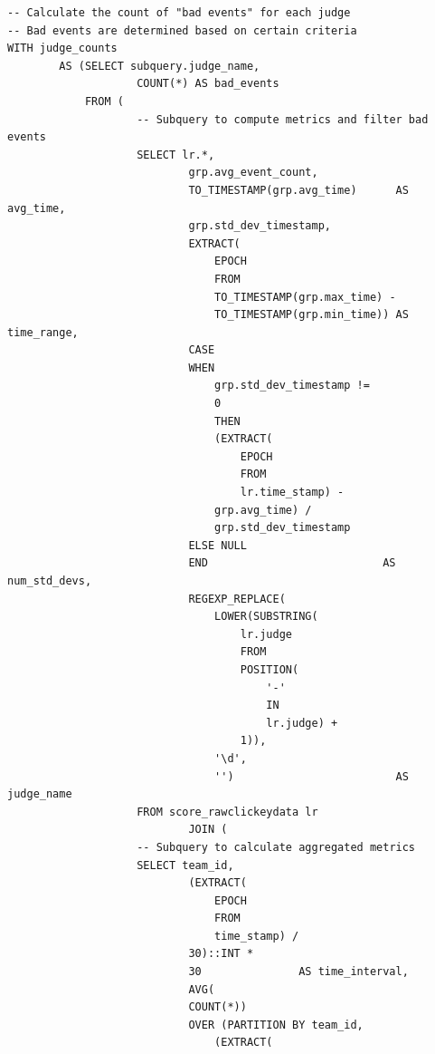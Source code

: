 \documentclass[11pt]{article}
\begin{document}
\begin{lstlisting}[style=sql, caption={Query to calculate timing stats}, label={lst:sql_judge_accuracy_query}, ]
-- Calculate the count of "bad events" for each judge
-- Bad events are determined based on certain criteria
WITH judge_counts
        AS (SELECT subquery.judge_name,
                    COUNT(*) AS bad_events
            FROM (
                    -- Subquery to compute metrics and filter bad events
                    SELECT lr.*,
                            grp.avg_event_count,
                            TO_TIMESTAMP(grp.avg_time)      AS avg_time,
                            grp.std_dev_timestamp,
                            EXTRACT(
                                EPOCH
                                FROM
                                TO_TIMESTAMP(grp.max_time) -
                                TO_TIMESTAMP(grp.min_time)) AS time_range,
                            CASE
                            WHEN
                                grp.std_dev_timestamp !=
                                0
                                THEN
                                (EXTRACT(
                                    EPOCH
                                    FROM
                                    lr.time_stamp) -
                                grp.avg_time) /
                                grp.std_dev_timestamp
                            ELSE NULL
                            END                           AS num_std_devs,
                            REGEXP_REPLACE(
                                LOWER(SUBSTRING(
                                    lr.judge
                                    FROM
                                    POSITION(
                                        '-'
                                        IN
                                        lr.judge) +
                                    1)),
                                '\d',
                                '')                         AS judge_name
                    FROM score_rawclickeydata lr
                            JOIN (
                    -- Subquery to calculate aggregated metrics
                    SELECT team_id,
                            (EXTRACT(
                                EPOCH
                                FROM
                                time_stamp) /
                            30)::INT *
                            30               AS time_interval,
                            AVG(
                            COUNT(*))
                            OVER (PARTITION BY team_id,
                                (EXTRACT(

\end{lstlisting}
\end{document}
